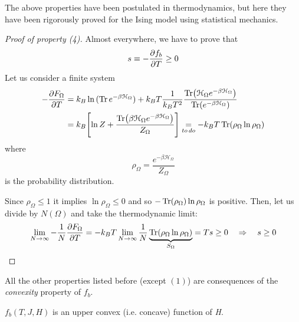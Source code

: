 \documentclass[../main/main.tex]{subfiles}
\begin{document}
\begin{remark}
The above properties have been postulated in thermodynamics, but here they have been rigorously proved for the Ising model using statistical mechanics.
\end{remark}
\begin{proof} [Proof of property (4)]
  Almost everywhere, we have to prove that
  \begin{equation*}
    s \equiv - \pdv{f_b}{T} \ge 0
  \end{equation*}
  Let us consider a finite system
  \begin{equation*}
  \begin{split}
  - \pdv{F_ \Omega }{T}   &= k_B \ln{(\Tr e^{- \beta \mathcal{H}_ \Omega }  )} + k_B T \frac{1}{k_B T^2} \frac{\Tr(\mathcal{H}_ \Omega  e^{-\beta \mathcal{H}_ \Omega } ) }{\Tr(e^{- \beta \mathcal{H}_ \Omega } ) } \\
  &= k_B \qty[\ln{Z} + \frac{\Tr(\beta \mathcal{H}_ \Omega e^{-\beta \mathcal{H}_ \Omega
  } ) }{Z_ \Omega } ] \underset{to\, do}{=}   - k_B T \Tr(\rho _ \Omega  \ln{\rho _ \Omega } )
  \end{split}
  \end{equation*}
  where
  \begin{equation*}
    \rho _ \Omega  = \frac{e^{-\beta \mathcal{H}_ \Omega } }{Z_ \Omega  }
  \end{equation*}
  is the probability distribution.

  Since \( \rho _ \Omega \le 1 \) it implies \( \ln{\rho _ \Omega } \le 0  \) and so \( - \Tr(\rho _ \Omega ) \ln{\rho _ \Omega }   \) is positive. Then, let us divide by \( N (\Omega ) \) and take the thermodynamic limit:
  \begin{equation*}
  \lim_{N \rightarrow \infty } - \frac{1}{N} \pdv{F_ \Omega }{T}   = - k_B T  \lim_{N \rightarrow \infty }  \frac{1}{N}  \underbrace{\Tr(\rho _ \Omega  \ln{\rho _ \Omega })}_{S _ \Omega }  = T s \ge 0  \quad \Rightarrow \quad s \ge 0
  \end{equation*}
\end{proof}

All the other properties listed before (except \( (1) \)) are consequences of the \emph{convexity} property of \( f_b \).

  \begin{theorem}{}{}
  \( f_b  (T,J,H)\) is an upper convex (i.e. concave) function of \emph{H}.
  \end{theorem}
\end{document}
